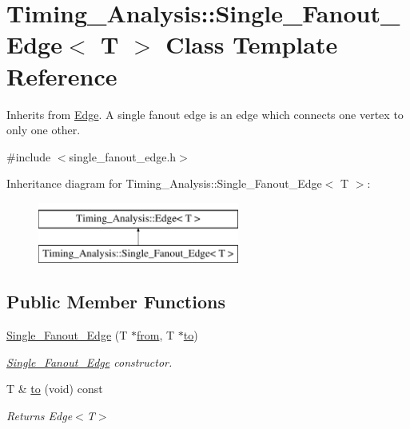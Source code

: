 \hypertarget{classTiming__Analysis_1_1Single__Fanout__Edge}{\section{Timing\-\_\-\-Analysis\-:\-:Single\-\_\-\-Fanout\-\_\-\-Edge$<$ T $>$ Class Template Reference}
\label{classTiming__Analysis_1_1Single__Fanout__Edge}
}


Inherits from \hyperlink{classTiming__Analysis_1_1Edge}{Edge}. A single fanout edge is an edge which connects one vertex to only one other.  




{\ttfamily \#include $<$single\-\_\-fanout\-\_\-edge.\-h$>$}

Inheritance diagram for Timing\-\_\-\-Analysis\-:\-:Single\-\_\-\-Fanout\-\_\-\-Edge$<$ T $>$\-:\begin{figure}[H]
\begin{center}
\leavevmode
\includegraphics[height=2.000000cm]{classTiming__Analysis_1_1Single__Fanout__Edge}
\end{center}
\end{figure}
\subsection*{Public Member Functions}
\begin{DoxyCompactItemize}
\item 
\hyperlink{classTiming__Analysis_1_1Single__Fanout__Edge_ac588152ff213288a57a744374039790a}{Single\-\_\-\-Fanout\-\_\-\-Edge} (T $\ast$\hyperlink{classTiming__Analysis_1_1Edge_a47020ea89fd9fde438adc814a731a23d}{from}, T $\ast$\hyperlink{classTiming__Analysis_1_1Single__Fanout__Edge_ac01deccce158b6cee6883924e6dcb788}{to})
\begin{DoxyCompactList}\small\item\em \hyperlink{classTiming__Analysis_1_1Single__Fanout__Edge}{Single\-\_\-\-Fanout\-\_\-\-Edge} constructor. \end{DoxyCompactList}\item 
T \& \hyperlink{classTiming__Analysis_1_1Single__Fanout__Edge_ac01deccce158b6cee6883924e6dcb788}{to} (void) const 
\begin{DoxyCompactList}\small\item\em Returns Edge$<$\-T$>$ \end{DoxyCompactList}\end{DoxyCompactItemize}
